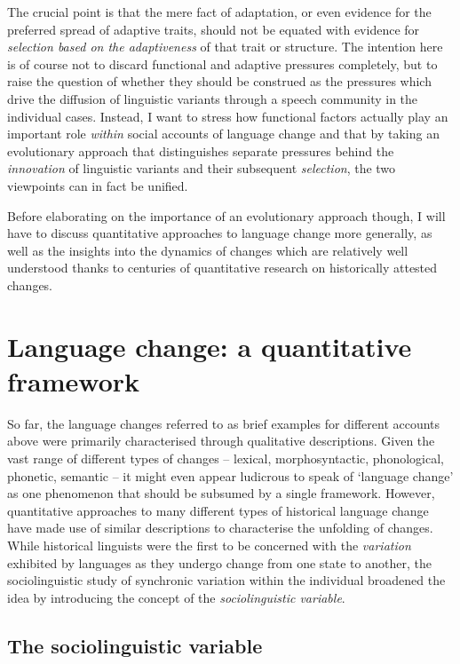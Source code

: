 The crucial point is that the mere fact of adaptation, or even evidence for the preferred spread of adaptive traits, should not be equated with evidence for \emph{selection based on the adaptiveness} of that trait or structure. %
The intention here is of course not to discard functional and adaptive pressures completely, but to raise the question of whether they should be construed as the pressures which drive the diffusion of linguistic variants through a speech community in the individual cases.
Instead, I want to stress how functional factors actually play an important role \emph{within} social accounts of language change and that by taking an evolutionary approach that distinguishes separate pressures behind the \emph{innovation} of linguistic variants and their subsequent \emph{selection}, the two viewpoints can in fact be unified.

Before elaborating on the importance of an evolutionary approach though, I will have to discuss quantitative approaches to language change more generally, as well as the insights into the dynamics of changes which are relatively well understood thanks to centuries of quantitative research on historically attested changes.

\section{Language change: a quantitative framework}

So far, the language changes referred to as brief examples for different accounts above were primarily characterised through qualitative descriptions. Given the vast range of different types of changes -- lexical, morphosyntactic, phonological, phonetic, semantic -- it might even appear ludicrous to speak of `language change' as one phenomenon that should be subsumed by a single framework.
However, quantitative approaches to many different types of historical language change have made use of similar descriptions to characterise the unfolding of changes. While historical linguists were the first to be concerned with the \emph{variation} exhibited by languages as they undergo change from one state to another, the sociolinguistic study of synchronic variation within the individual broadened the idea by introducing the concept of the \emph{sociolinguistic variable}.

\subsection{The sociolinguistic variable}
\label{sec:sociolinguisticvariable}

